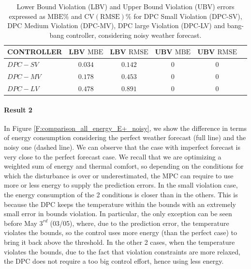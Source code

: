 \begin{table}[t!]
	\centering
	\textcolor[rgb]{0,0,1}{\begin{tabular}{lccccc}
		\toprule
		CONTROLLER  & LBV $\mathrm{MBE}$  & LBV $\mathrm{RMSE}$ & UBV $\mathrm{MBE}$ & UBV $\mathrm{RMSE}$ 	\\ 
		\midrule
		$DPC-SV$    & $0.034$             & $0.142$  			      & $0$    				 & $0$     	  	\\
		$DPC-MV$    & $0.178$ 			  & $0.453$       			  & $0$    				 & $0$		  	\\
		$DPC-LV$    & $0.478$  			  & $0.891$     			  & $0$    				 & $0$	      	\\
		\bottomrule
	\end{tabular}}
	\caption{\textcolor[rgb]{0,0,1}{Lower Bound Violation (LBV) and Upper Bound Violation (UBV) errors expressed as $\mathrm{MBE}\%$ and $\mathrm{CV(RMSE)}\%$ for DPC Small Violation (DPC-SV), DPC Medium Violation (DPC-MV), DPC large Violation (DPC-LV) and bang-bang controller, considering noisy weather forecast.}}
	\captionsetup{justification=centering}
	\label{T:violationErrorsNoisy}
\end{table}


\textcolor[rgb]{0,0,1}{\paragraph{Result 2} 
In Figure \ref{F:comparison_all_energy_E+_noisy}, we show the difference in terms of energy consumption considering the perfect weather forecast (full line) and the noisy one (dashed line).
We can observe that the case with imperfect forecast is very close to the perfect forecast case.
We recall that we are optimizing a weighted sum of energy and thermal comfort, so depending on the conditions for which the disturbance is over or underestimated, the MPC can require to use more or less energy to supply the prediction errors.
In the small violation case, the energy consumption of the 2 conditions is closer than in the others.
This is because the DPC keeps the temperature within the bounds with an extremely small error in bounds violation.
In particular, the only exception can be seen before May $3^{rd}$ (03/05), where, due to the prediction error, the temperature violates the bounds, so the control uses more energy (than the perfect case) to bring it back above the threshold.
In the other 2 cases, when the temperature violates the bounds, due to the fact that violation constraints are more relaxed, the DPC does not require a too big control effort, hence using less energy.}


